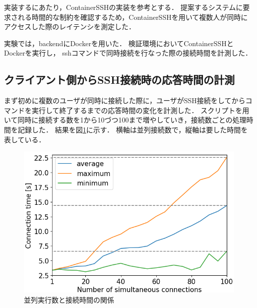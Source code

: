 \documentclass[dvipdfmx]{cs-handout}
\begin{document}
実装するにあたり，ContainerSSHの実装を参考とする．
提案するシステムに要求される時間的な制約を確認するため，ContainerSSHを用いて複数人が同時にアクセスした際のレイテンシを測定した．

実験では，backendにDockerを用いた．
検証環境においてContainerSSHとDockerを実行し， sshコマンドで同時接続を行なった際の接続時間を計測した．

\subsection{クライアント側からSSH接続時の応答時間の計測}

まず初めに複数のユーザが同時に接続した際に，ユーザがSSH接続をしてからコマンドを実行して終了するまでの応答時間の変化を計測した．
スクリプトを用いて同時に接続する数を1から10づつ100まで増やしていき，接続数ごとの処理時間を記録した．
結果を図\ref{fig:connect}に示す．
横軸は並列接続数で，縦軸は要した時間を表している．
%
%
%
\begin{figure}[tb]
\includegraphics[width=0.9\linewidth]{./fig/connect.png}
\caption{並列実行数と接続時間の関係}
\label{fig:connect}
\end{figure}
\end{document}
